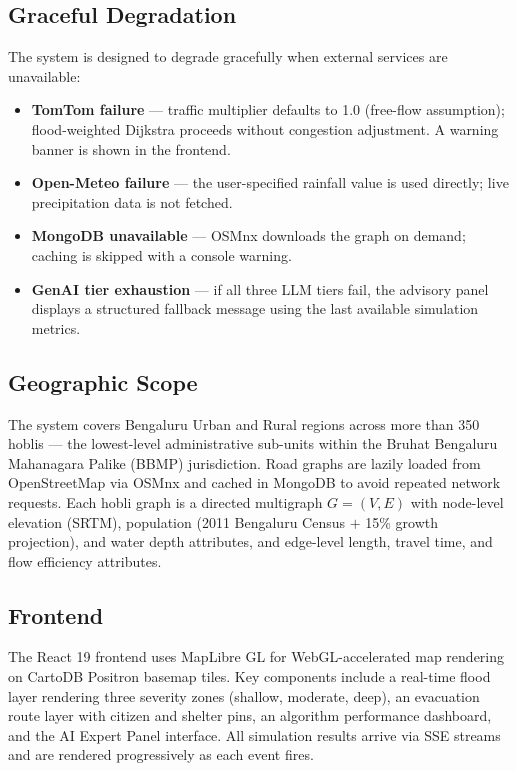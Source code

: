 \documentclass[journal]{IEEEtran}
\begin{document}
\subsection{Graceful Degradation}

The system is designed to degrade gracefully when external services are unavailable:
\begin{itemize}
  \item \textbf{TomTom failure} — traffic multiplier defaults to 1.0 (free-flow assumption);
  flood-weighted Dijkstra proceeds without congestion adjustment. A warning banner is shown
  in the frontend.
  \item \textbf{Open-Meteo failure} — the user-specified rainfall value is used directly;
  live precipitation data is not fetched.
  \item \textbf{MongoDB unavailable} — OSMnx downloads the graph on demand; caching is
  skipped with a console warning.
  \item \textbf{GenAI tier exhaustion} — if all three LLM tiers fail, the advisory panel
  displays a structured fallback message using the last available simulation metrics.
\end{itemize}

\subsection{Geographic Scope}

The system covers Bengaluru Urban and Rural regions across more than 350 hoblis — the
lowest-level administrative sub-units within the Bruhat Bengaluru Mahanagara Palike (BBMP)
jurisdiction. Road graphs are lazily loaded from OpenStreetMap \cite{osm2017} via OSMnx
\cite{boeing2017} and cached in MongoDB to avoid repeated network requests. Each hobli
graph is a directed multigraph $G = (V, E)$ with node-level elevation (SRTM), population
(2011 Bengaluru Census $+$ 15\% growth projection), and water depth attributes, and
edge-level length, travel time, and flow efficiency attributes.

\subsection{Frontend}

The React 19 frontend uses MapLibre GL for WebGL-accelerated map rendering on CartoDB
Positron basemap tiles. Key components include a real-time flood layer rendering three
severity zones (shallow, moderate, deep), an evacuation route layer with citizen and shelter
pins, an algorithm performance dashboard, and the AI Expert Panel interface. All simulation
results arrive via SSE streams and are rendered progressively as each event fires.
\end{document}
